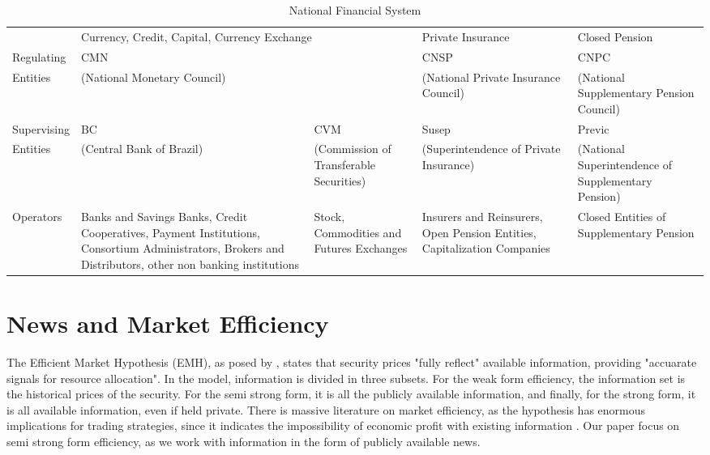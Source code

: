 \documentclass[cic,tc, english]{iiufrgs}
\begin{document}
    \begin{table}[H]
        \caption{National Financial System}
        \label{tab:sistemanacional}
        \centering
        \begin{tabular}{lp{2.3cm}|p{2.3cm}|p{2.3cm}|p{2.3cm}}
             & \multicolumn{2}{p{4.6cm}||}{Currency, Credit, Capital, Currency Exchange} & \multicolumn{1}{l||}{Private Insurance} & \multicolumn{1}{l}{Closed Pension} \\ \cline{2-5} 
            \multicolumn{1}{l|}{Regulating} & \multicolumn{2}{l||}{CMN} & \multicolumn{1}{p{2.3cm}||}{CNSP} & \multicolumn{1}{p{2.3cm}|}{CNPC} \\
            \multicolumn{1}{l|}{Entities} & \multicolumn{2}{l||}{(National Monetary Council)} & \multicolumn{1}{p{2.75cm}||}{(National Private Insurance Council)} & \multicolumn{1}{p{2.3cm}|}{(National Supplementary Pension Council)} \\ \hline
            \multicolumn{1}{l|}{Supervising} & \multicolumn{1}{p{2.3cm}||}{BC} & \multicolumn{1}{p{2.3cm}||}{CVM} & \multicolumn{1}{p{2.3cm}||}{Susep} & \multicolumn{1}{p{2.3cm}|}{Previc} \\
            \multicolumn{1}{l|}{Entities} & \multicolumn{1}{p{2.3cm}||}{(Central Bank of Brazil)} & \multicolumn{1}{p{2.3cm}||}{(Commission of Transferable Securities)} & \multicolumn{1}{p{2.75cm}||}{(Superintendence of Private Insurance)} & \multicolumn{1}{p{2.3cm}|}{(National Superintendence of Supplementary Pension)} \\ \hline
            \multicolumn{1}{l|}{Operators} & \multicolumn{1}{p{2.3cm}||}{Banks and Savings Banks,  Credit Cooperatives, Payment Institutions, Consortium Administrators, Brokers and Distributors, other non banking institutions} & \multicolumn{1}{p{2.3cm}||}{Stock, Commodities and Futures Exchanges} & \multicolumn{1}{p{2.75cm}||}{Insurers and Reinsurers, Open Pension Entities, Capitalization Companies} & \multicolumn{1}{p{2.3cm}|}{Closed Entities of Supplementary Pension} \\ \cline{2-5} 
        \end{tabular}
    \end{table}

\chapter{News and Market Efficiency} \label{chapter_literature}

    The Efficient Market Hypothesis (EMH), as posed by \citet{fama1970}, states that security prices "fully reflect" available information, providing "accuarate signals for resource allocation". In the model, information is divided in three subsets. For the weak form efficiency, the information set is the historical prices of the security. For the semi strong form, it is all the publicly available information, and finally, for the strong form, it is all available information, even if held private. There is massive literature on market efficiency, as the hypothesis has enormous implications for trading strategies, since it indicates the impossibility of economic profit with existing information \citet{kamal2014}. Our paper focus on semi strong form efficiency, as we work with information in the form of publicly available news.
\end{document}
